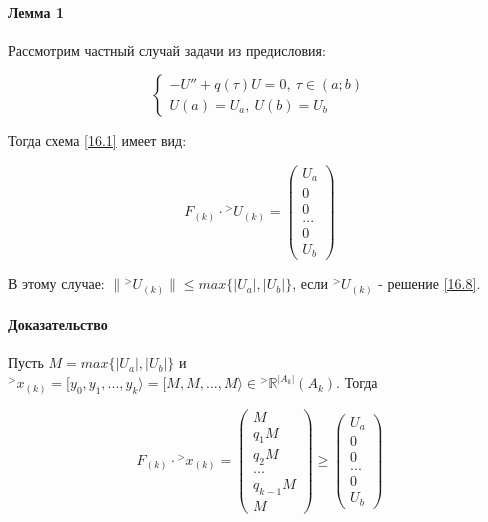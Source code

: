 \documentclass[__main__.tex]{subfiles}
\begin{document}
\paragraph{Лемма 1}

Рассмотрим частный случай задачи из предисловия:

\begin{equation}\label{16.7}
\begin{cases}
-U''+q\left(\tau\right) U =0, \ \tau \in \left(a;b\right) \\
U\left(a\right) = U_a, \ U\left(b\right) = U_b
\end{cases}
\end{equation}

Тогда схема \ref{16.1} имеет вид:

\begin{equation}\label{16.8}
F_{\left(k\right)} \cdot {}^>U_{\left(k\right)} = \left(
\begin{matrix}
U_a \\ 0 \\ 0 \\ ... \\ 0 \\ U_b
\end{matrix}
\right)
\end{equation}

В этому случае: $\| {}^>U_{\left(k\right)} \| \leq max \{ \left|U_a\right|, \left|U_b\right| \}$, если ${}^>U_{\left(k\right)}$ - решение \ref{16.8}.

\paragraph{Доказательство}

Пусть $M = max \{ \left|U_a\right|, \left|U_b\right| \}$ и ${}^> x_{\left(k\right)} = [y_0, y_1, ..., y_k \rangle = [M,M,...,M \rangle \in {}^> \mathbb{R}^{\left|A_k\right|} \left(A_k\right)$. Тогда 

$$
F_{\left(k\right)} \cdot {}^>x_{\left(k\right)} = \left(
\begin{matrix}
M \\ q_1 M \\ q_2 M \\ ... \\ q_{k-1} M \\ M
\end{matrix}
\right) \geq \left(
\begin{matrix}
U_a \\ 0 \\ 0 \\... \\ 0 \\ U_b
\end{matrix}
\right)
$$
\end{document}
